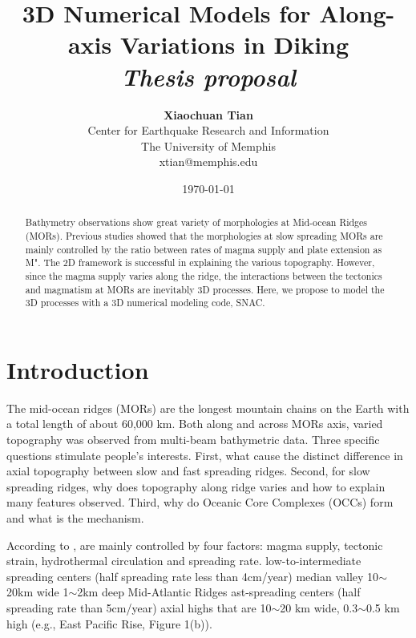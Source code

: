 \documentclass[12pt]{article}
\title{{\bf 3D Numerical Models for Along-axis Variations in Diking} \\
\it Thesis proposal}
\author{ {\bf Xiaochuan Tian}  \\
Center for Earthquake Research and Information \\
The University of Memphis\\
{\small xtian@memphis.edu}
}
\date{\today}
\begin{document}
\pagestyle{plain}
\maketitle

\pagebreak
\begin{abstract}

Bathymetry observations show great variety of morphologies at Mid-ocean Ridges (MORs). Previous studies showed that the morphologies at slow spreading MORs are mainly controlled by the ratio between rates of magma supply and plate extension as M". The 2D framework is successful in explaining the various topography. However, since the magma supply varies along the ridge, the interactions between the tectonics and magmatism at MORs are inevitably 3D processes. Here, we propose to model the 3D processes with a 3D numerical modeling code, SNAC.

\end{abstract}

\pagebreak
\tableofcontents
\pagebreak

\cleardoublepage
{}

\section{Introduction}
\label{ch:intro}
The mid-ocean ridges (MORs) are the longest mountain chains on the Earth with a total length of about 60,000 km. Both along and across MORs axis, varied topography was observed from multi-beam bathymetric data. Three specific questions stimulate people's interests. First, what cause the distinct difference in axial topography between slow and fast spreading ridges. Second, for slow spreading ridges, why does topography  along ridge varies and how to explain many features observed. Third, why do Oceanic Core Complexes (OCCs) form and what is the mechanism. 

According to \citep{Fowler2004},  are mainly
controlled by four factors: magma supply, tectonic strain, hydrothermal circulation and spreading rate. low-to-intermediate spreading centers (half spreading rate less than 4cm/year)  median valley \remove[EC]{(}10$\sim$20km wide 1$\sim$2km deep Mid-Atlantic Ridges ast-spreading centers (half spreading rate  than 5cm/year)  axial highs that are 10$\sim$20 km wide, 0.3$\sim$0.5 km high (e.g., East Pacific Rise, Figure 1(b)).
\end{document}
